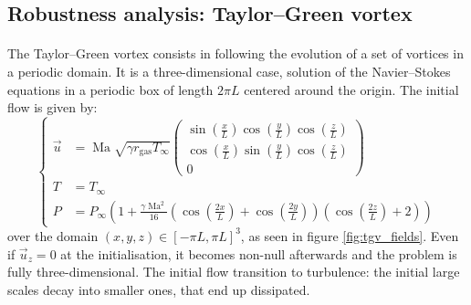     \subsection{Robustness analysis: Taylor--Green vortex}

      \paragraph{}
      The Taylor--Green vortex consists in following the evolution of a set of vortices in a periodic domain.
      It is a three-dimensional case, solution of the Navier--Stokes equations in a periodic box of length $2 \pi L$ centered around the origin.
      The initial flow is given by:
      \begin{equation}\label{eq:tgv}
        \left\{\begin{aligned}
          \vec{u} &= \operatorname{Ma} \sqrt{\gamma r_\textrm{gas} T_\infty} \begin{pmatrix}
            \sin\left(\frac{x}{L}\right) \cos\left(\frac{y}{L}\right) \cos\left(\frac{z}{L}\right) \\[10pt]
            \cos\left(\frac{x}{L}\right) \sin\left(\frac{y}{L}\right) \cos\left(\frac{z}{L}\right) \\[10pt]
            0
          \end{pmatrix} \\[10pt]
          T &= T_\infty \\[10pt]
          P &= P_\infty \left(1 + \frac{\gamma \operatorname{Ma}^2}{16} \left(\cos\left(\frac{2x}{L}\right) + \cos\left(\frac{2y}{L}\right)\right) \left(\cos\left(\frac{2z}{L}\right) + 2\right) \right)
        \end{aligned}\right.
      \end{equation}
      over the domain $\left(x, y, z\right) \in \left[-\pi L, \pi L\right]^3$, as seen in figure \ref{fig:tgv_fields}.
      Even if $\vec{u}_z = 0$ at the initialisation, it becomes non-null afterwards and the problem is fully three-dimensional.
      The initial flow transition to turbulence: the initial large scales decay into smaller ones, that end up dissipated.

